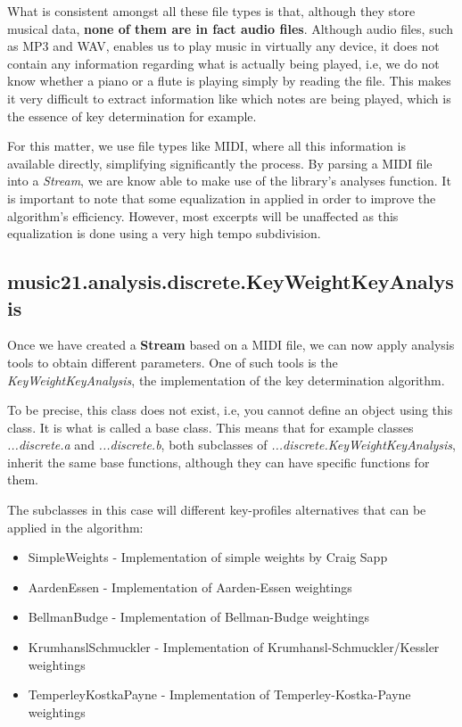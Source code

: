 What is consistent amongst all these file types is that, although they store musical data, \textbf{none of them are in fact audio files}.
Although audio files, such as MP3 and WAV, enables us to play music in virtually any device, it does not contain any information regarding what is actually being played, 
i.e, we do not know whether a piano or a flute is playing simply by reading the file. This makes it very difficult to extract information like which notes are being played,
which is the essence of key determination for example.

For this matter, we use file types like MIDI, where all this information is available directly, simplifying significantly the process.
By parsing a MIDI file into a \textit{Stream}, we are know able to make use of the library's analyses function.
It is important to note that some equalization in applied in order to improve the algorithm's efficiency.
However, most excerpts will be unaffected as this equalization is done using a very high tempo subdivision.

\subsection{music21.analysis.discrete.KeyWeightKeyAnalysis} \label{sec:analysis_discrete}

Once we have created a \textbf{Stream} based on a MIDI file, we can now apply analysis tools to obtain different parameters.
One of such tools is the \textit{KeyWeightKeyAnalysis}, the implementation of the key determination algorithm.

To be precise, this class does not exist, i.e, you cannot define an object using this class. It is what is called a base class.
This means that for example classes \textit{...discrete.a} and \textit{...discrete.b}, both subclasses of \textit{...discrete.KeyWeightKeyAnalysis},
inherit the same base functions, although they can have specific functions for them.

The subclasses in this case will different key-profiles alternatives that can be applied in the algorithm:
\begin{itemize}
    \item SimpleWeights - Implementation of simple weights by Craig Sapp \cite{sapp2011computational}
    \item AardenEssen - Implementation of Aarden-Essen weightings \cite{aarden2003dynamic}
    \item BellmanBudge - Implementation of Bellman-Budge weightings \cite{bellmann2005determination}
    \item KrumhanslSchmuckler - Implementation of Krumhansl-Schmuckler/Kessler weightings \cite{krumhansl2001cognitive}
    \item TemperleyKostkaPayne - Implementation of Temperley-Kostka-Payne weightings \cite{Temperley2004Musicp}
\end{itemize}

